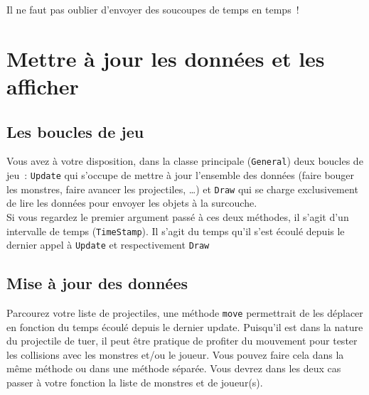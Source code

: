 Il ne faut pas oublier d'envoyer des soucoupes de temps en temps~!


\section{Mettre à jour les données et les afficher}

\subsection{Les boucles de jeu}

Vous avez à votre disposition, dans la classe principale (\texttt{General}) deux boucles de jeu~: \texttt{Update} qui s'occupe de mettre à jour l'ensemble des données (faire bouger les monstres, faire avancer les projectiles, \ldots) et \texttt{Draw} qui se charge exclusivement de lire les données pour envoyer les objets à la surcouche.\\

Si vous regardez le premier argument passé à ces deux méthodes, il s'agit d'un intervalle de temps (\texttt{TimeStamp}). Il s'agit du temps qu'il s'est écoulé depuis le dernier appel à \texttt{Update} et respectivement \texttt{Draw}


\subsection{Mise à jour des données}

Parcourez votre liste de projectiles, une méthode \texttt{move} permettrait de les déplacer en fonction du temps écoulé depuis le dernier update. Puisqu'il est dans la nature du projectile de tuer, il peut être pratique de profiter du mouvement pour tester les collisions avec les monstres et/ou le joueur. Vous pouvez faire cela dans la même méthode ou dans une méthode séparée. Vous devrez dans les deux cas passer à votre fonction la liste de monstres et de joueur(s).\\

